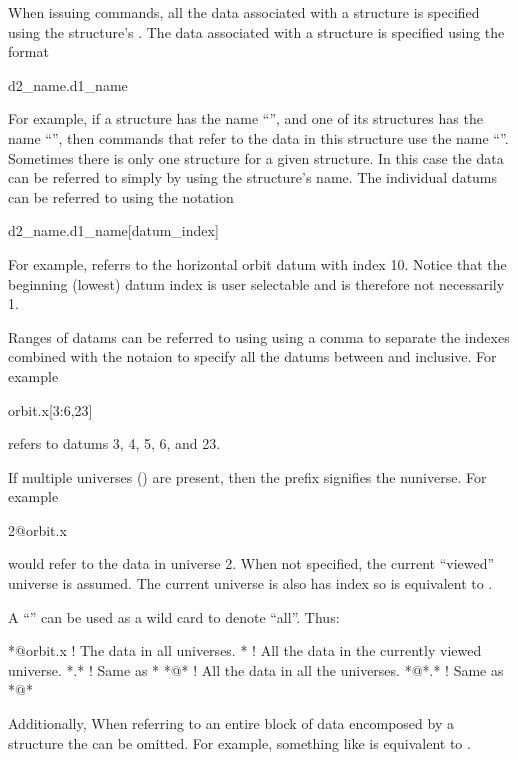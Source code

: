 When issuing \tao commands, all the
data associated with a  structure is specified using the
 structure's .  The data associated with a
 structure is specified using the format
\begin{example}
  d2_name.d1_name
\end{example}
For example, if a  structure has the
name ``'', and one of its  structures has the
name ``'', then \tao commands that refer to the data in this
 structure use the name ``''. Sometimes there
is only one  structure for a given 
structure. In this case the data can be referred to simply by using
the  structure's name. The individual datums can be
referred to using the notation
\begin{example}
  d2_name.d1_name[datum_index]
\end{example}
For example,  referrs to the horizontal orbit datum
with index 10. Notice that the beginning (lowest) datum index is user
selectable and is therefore not necessarily 1.

Ranges of datams can be referred to using using a comma \vn{,} to
separate the indexes combined with the notaion  to specify
all the datums between  and  inclusive. For example
\begin{example}
  orbit.x[3:6,23]
\end{example}
refers to datums 3, 4, 5, 6, and 23. 

If multiple universes () are present, then the prefix
 signifies the n\Th universe. For example
\begin{example}
  2@orbit.x
\end{example}
would refer to the  data in universe 2. When not
specified, the current ``viewed'' universe is assumed. The current
 universe is also has index  so  is
equivalent to .

A ``\vn{*}'' can be used as a wild card to denote ``all''. Thus:
\begin{example}
  *@orbit.x   ! The  data in all universes.
  *           ! All the data in the currently viewed universe.
  *.*         ! Same as *
  *@*         ! All the data in all the universes. 
  *@*.*       ! Same as *@*
\end{example}
Additionally, When referring to an entire block of data encomposed by
a  structure the \vn{[*]} can be omitted. For example,
something like  is equivalent to
.

